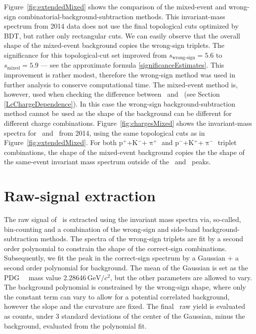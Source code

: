 Figure~\ref{fig:extendedMixed} shows the comparison of the mixed-event and wrong-sign combinatorial-background-subtraction methods. This invariant-mass spectrum from 2014 data does not use the final topological cuts optimized by BDT, but rather only rectangular cuts. We can easily observe that the overall shape of the mixed-event background copies the wrong-sign triplets. The significance for this topological-cut set improved from   $s_\text{wrong-sign} = 5.6$ to $s_\text{mixed} = 5.9$ --- see the approximate formula \eqref{significanceEstimates}\@. This improvement is rather modest, therefore the wrong-sign method was used in further analysis to conserve computational time.
The mixed-event method is, however, used when checking the difference between \Lcplus\  and \Lcminus\ (see Section \ref{LcChargeDependence})\@. In this case the wrong-sign background-subtraction method cannot be used as the shape of the background can be different for different charge combinations. Figure~\ref{fig:chargesMixed} shows the invariant-mass spectra for \Lcplus\ and \Lcminus\ from 2014, using the same topological cuts as in Figure~\ref{fig:extendedMixed}\@. For both p$^+$+K$^-$+$\uppi^+$ and p$^-$+K$^+$+$\uppi^-$ triplet combinations, the shape of the mixed-event background copies the the shape of the same-event invariant mass spectrum outside of the \Lcplus\ and \Lcminus\ peaks.

% 
% 
% 

\section{\label{raw}Raw-signal extraction}

The raw signal of \Lambdacpm\ is extracted using the invariant mass spectra via, so-called, bin-counting and a combination of the wrong-sign and side-band background-subtraction methods. The spectra of the wrong-sign triplets are fit by a second order polynomial to constrain the shape of the correct-sign combinations. Subsequently, we fit the peak in the correct-sign spectrum by a Gaussian + a second order polynomial for background. The mean of the Gaussian is set as the PDG~\cite{PDG} \Lambdac\ mass value 2.28646$\,\text{GeV}/c^2$, but the other parameters are allowed to vary. The background polynomial is constrained by the wrong-sign shape, where only the constant term can vary to allow for a potential correlated background, however the slope and the curvature are fixed. The final \Lambdacpm\ raw yield is evaluated as counts, under 3 standard deviations of the center of the Gaussian, minus the background, evaluated from the polynomial fit.

